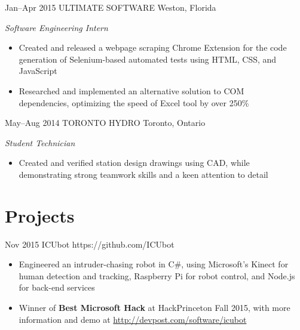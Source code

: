 \documentclass[print]{resume} %
\begin{document}
\begin{entrylist}
\entry
{Jan--Apr 2015}
{ULTIMATE SOFTWARE}
{Weston, Florida}
{\emph{Software Engineering Intern}
\begin{itemize}
\item Created and released a webpage scraping Chrome Extension for the code generation of Selenium-based automated tests using HTML, CSS, and JavaScript 
\item Researched and implemented an alternative solution to COM \\ dependencies, optimizing the speed of Excel tool by over 250\%
\end{itemize}}
\end{entrylist}


\begin{entrylist}
\entry
{May--Aug 2014}
{TORONTO HYDRO}
{Toronto, Ontario}
{\emph{Student Technician}
\begin{itemize}
\item Created and verified station design drawings using CAD, while \\ demonstrating strong teamwork skills and a keen attention to detail  
\end{itemize}
}
\end{entrylist}


\section{Projects}

\begin{projlist}
\proj
{Nov 2015}
{ICUbot}
{https://github.com/ICUbot}
{
\begin{itemize}
\item Engineered an intruder-chasing robot in C\#, using Microsoft's Kinect for human detection and tracking, Raspberry Pi for robot control, and Node.js for back-end services
\item Winner of \textbf{Best Microsoft Hack} at HackPrinceton Fall 2015, with more information and demo at \href{http://devpost.com/software/icubot}{http://devpost.com/software/icubot}
\end{itemize}}
\end{projlist}
\end{document}
